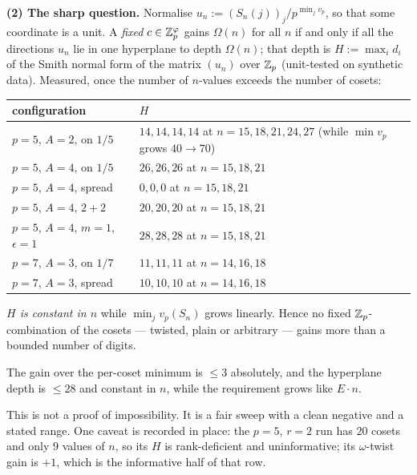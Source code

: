 \smallskip\noindent\textbf{(2) The sharp question.} Normalise
$u_n:=(S_n(j))_j/p^{\min_jv_p}$, so that some coordinate is a unit. A \emph{fixed}
$c\in\mathbb{Z}_p^{\varphi}$ gains $\Omega(n)$ for all $n$ if and only if all the directions $u_n$ lie
in one hyperplane to depth $\Omega(n)$; that depth is $H:=\max_id_i$ of the Smith normal
form of the matrix $(u_n)$ over $\mathbb{Z}_p$ (unit-tested on synthetic data). Measured, once the
number of $n$-values exceeds the number of cosets:
\begin{center}
\tabsmall
\begin{tabular}{ll}
\toprule
configuration & $H$\\
\midrule
$p=5$, $A=2$, on $1/5$ & $14,14,14,14$ at $n=15,18,21,24,27$ (while $\min v_p$ grows $40\to70$)\\
$p=5$, $A=4$, on $1/5$ & $26,26,26$ at $n=15,18,21$\\
$p=5$, $A=4$, spread & $0,0,0$ at $n=15,18,21$\\
$p=5$, $A=4$, $2{+}2$ & $20,20,20$ at $n=15,18,21$\\
$p=5$, $A=4$, $m=1$, $\epsilon=1$ & $28,28,28$ at $n=15,18,21$\\
$p=7$, $A=3$, on $1/7$ & $11,11,11$ at $n=14,16,18$\\
$p=7$, $A=3$, spread & $10,10,10$ at $n=14,16,18$\\
\bottomrule
\end{tabular}
\end{center}
\emph{$H$ is constant in $n$} while $\min_jv_p(S_n)$ grows linearly. Hence no fixed
$\mathbb{Z}_p$-combination of the cosets --- twisted, plain or arbitrary --- gains more than a bounded
number of digits.

\begin{finding}\label{find:hatch}
The gain over the per-coset minimum is $\le3$ absolutely, and the hyperplane depth is
$\le28$ and constant in $n$, while the requirement grows like $E\cdot n$.
\end{finding}

\begin{remark}\label{rem:hatchcaveat}
This is not a proof of impossibility. It is a fair sweep with a clean negative and a stated
range. One caveat is recorded in place: the $p=5$, $r=2$ run has $20$ cosets and only $9$
values of $n$, so its $H$ is rank-deficient and uninformative; its $\omega$-twist gain is
$+1$, which is the informative half of that row.
\end{remark}

